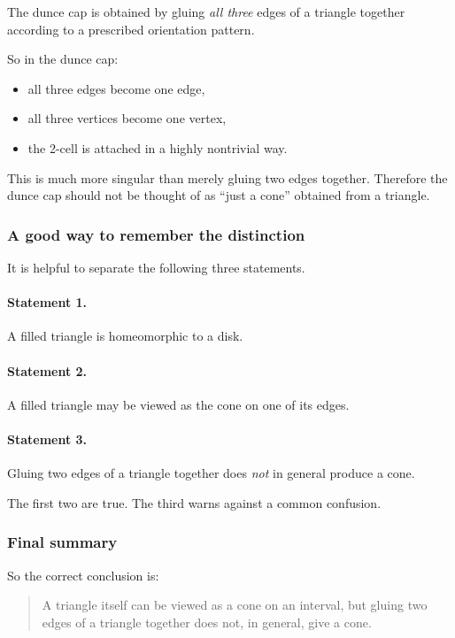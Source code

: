 \documentclass[12pt,a4paper]{article}
\theoremstyle{notespace}
\begin{document}
The dunce cap is obtained by gluing \emph{all three} edges of a triangle together according to a prescribed orientation pattern.

So in the dunce cap:

\begin{itemize}
	\item all three edges become one edge,
	\item all three vertices become one vertex,
	\item the 2-cell is attached in a highly nontrivial way.
\end{itemize}

This is much more singular than merely gluing two edges together. Therefore the dunce cap should not be thought of as ``just a cone'' obtained from a triangle.

\subsubsection{A good way to remember the distinction}

It is helpful to separate the following three statements.

\paragraph{Statement 1.}
A filled triangle is homeomorphic to a disk.

\paragraph{Statement 2.}
A filled triangle may be viewed as the cone on one of its edges.

\paragraph{Statement 3.}
Gluing two edges of a triangle together does \emph{not} in general produce a cone.

The first two are true. The third warns against a common confusion.

\subsubsection{Final summary}

So the correct conclusion is:

\begin{quote}
	A triangle itself can be viewed as a cone on an interval, but gluing two edges of a triangle together does not, in general, give a cone.
\end{quote}
\end{document}
